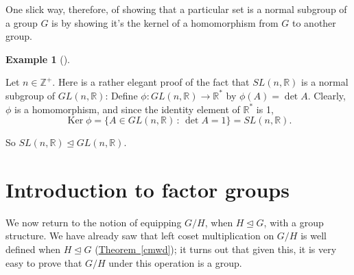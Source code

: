 \documentclass[10pt,]{book}
\theoremstyle{plain}
\theoremstyle{definition}
\theoremstyle{definition}
\theoremstyle{definition}
\newtheorem{example}[theorem]{Example}
\theoremstyle{definition}
\numberwithin{equation}{section}
\def\Z{\mathbb{Z}}
\def\R{\mathbb{R}}
\DeclareMathOperator{\Ker}{Ker}
\begin{document}
    One slick way, therefore, of showing that a particular set is a
    normal subgroup of a group \(G\) is by showing it's the kernel of a
    homomorphism from \(G\) to another group.
\begin{example}[]\label{slnormgl}

        Let \(n\in \Z^+\). Here is a rather elegant proof of the fact that
        \(SL(n,\R)\) is a normal subgroup of \(GL(n,\R)\): Define \(\phi:
        GL(n,\R) \to \R^*\) by \(\phi(A)=\det A\). Clearly, \(\phi\) is a
        homomorphism, and since the identity element of \(\R^*\) is 1,
\begin{equation*}

          \Ker \phi=\{A\in GL(n,\R)\,:\,\det A= 1\}=SL(n,\R).
        
\end{equation*}

\par

        So
        \(SL(n,\R)\unlhd GL(n,\R)\).
\end{example}
\typeout{************************************************}
\typeout{************************************************}
\section[{Introduction to factor groups}]{Introduction to factor groups}\label{section-27}

    We now return to the notion
    of equipping \(G/H\), when \(H\unlhd G\), with a group structure.
    We have already saw that left coset multiplication on \(G/H\)
    is well defined when \(H\unlhd G\) (\hyperref[cmwd]{Theorem~\ref{cmwd}}); it turns out that given this,
    it is very easy to prove that \(G/H\) under this operation is a
    group.
\par
\end{document}
